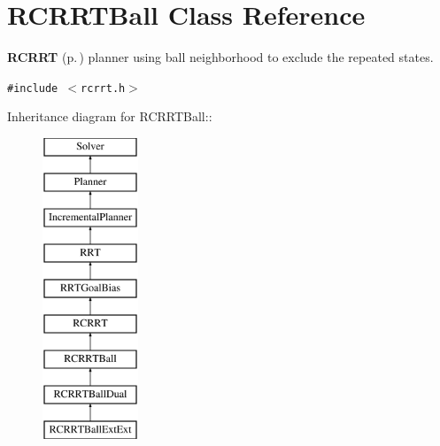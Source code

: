 \section{RCRRTBall  Class Reference}
\label{classRCRRTBall}
{\bf RCRRT} {\rm (p.\,\pageref{classRCRRT})} planner using ball neighborhood to exclude the repeated states. 


{\tt \#include $<$rcrrt.h$>$}

Inheritance diagram for RCRRTBall::\begin{figure}[H]
\begin{center}
\leavevmode
\includegraphics[height=9cm]{classRCRRTBall}
\end{center}
\end{figure}
